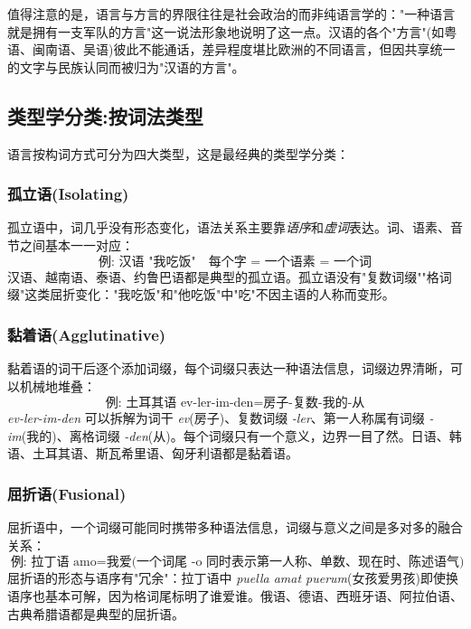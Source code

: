 值得注意的是，语言与方言的界限往往是社会政治的而非纯语言学的："一种语言就是拥有一支军队的方言"这一说法形象地说明了这一点。汉语的各个"方言"(如粤语、闽南语、吴语)彼此不能通话，差异程度堪比欧洲的不同语言，但因共享统一的文字与民族认同而被归为"汉语的方言"。

\subsection{类型学分类:按词法类型}

语言按构词方式可分为四大类型，这是最经典的类型学分类：

\subsubsection{孤立语(Isolating)}

孤立语中，词几乎没有形态变化，语法关系主要靠\emph{语序}和\emph{虚词}表达。词、语素、音节之间基本一一对应：
\begin{equation}
    \text{例: 汉语 "我吃饭"} \quad \text{每个字 = 一个语素 = 一个词}
\end{equation}
汉语、越南语、泰语、约鲁巴语都是典型的孤立语。孤立语没有"复数词缀""格词缀"这类屈折变化："我吃饭"和"他吃饭"中"吃"不因主语的人称而变形。

\subsubsection{黏着语(Agglutinative)}

黏着语的词干后逐个添加词缀，每个词缀只表达一种语法信息，词缀边界清晰，可以机械地堆叠：
\begin{equation}
    \text{例: 土耳其语 ev-ler-im-den} = \text{房子-复数-我的-从}
\end{equation}
\textit{ev-ler-im-den} 可以拆解为词干 \textit{ev}(房子)、复数词缀 \textit{-ler}、第一人称属有词缀 \textit{-im}(我的)、离格词缀 \textit{-den}(从)。每个词缀只有一个意义，边界一目了然。日语、韩语、土耳其语、斯瓦希里语、匈牙利语都是黏着语。

\subsubsection{屈折语(Fusional)}

屈折语中，一个词缀可能同时携带多种语法信息，词缀与意义之间是多对多的融合关系：
\begin{equation}
    \text{例: 拉丁语 amo} = \text{我爱(一个词尾 -o 同时表示第一人称、单数、现在时、陈述语气)}
\end{equation}
屈折语的形态与语序有"冗余"：拉丁语中 \textit{puella amat puerum}(女孩爱男孩)即使换语序也基本可解，因为格词尾标明了谁爱谁。俄语、德语、西班牙语、阿拉伯语、古典希腊语都是典型的屈折语。

